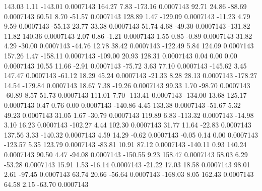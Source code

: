       143.03        1.11     -143.01     0.0007143
      164.27        7.83     -173.16     0.0007143
       92.71       24.86      -88.69     0.0007143
       60.51        8.70      -51.57     0.0007143
      128.89        1.47     -129.09     0.0007143
      -11.23        4.79        9.59     0.0007143
      -55.13       23.77       33.38     0.0007143
       51.74        4.68      -49.30     0.0007143
     -131.82       11.82      140.36     0.0007143
        2.07        0.86       -1.21     0.0007143
        1.55        0.85       -0.89     0.0007143
       31.82        4.29      -30.00     0.0007143
      -44.76       12.78       38.42     0.0007143
     -122.49        5.84      124.09     0.0007143
      157.26        1.47     -158.11     0.0007143
     -109.00       20.93      128.31     0.0007143
        0.04        0.00        0.00     0.0007143
       10.55       11.66       -2.91     0.0007143
      -75.72        3.63       77.10     0.0007143
     -145.62        3.45      147.47     0.0007143
      -61.12       18.29       45.24     0.0007143
      -21.33        8.28       28.13     0.0007143
     -178.27       14.54     -179.84     0.0007143
       18.67        7.38      -19.26     0.0007143
       99.33        1.70      -98.70     0.0007143
      -60.89        8.57       51.73     0.0007143
      111.01        7.70     -113.41     0.0007143
     -134.00       13.68      125.17     0.0007143
        0.47        0.76        0.00     0.0007143
     -140.86        4.45      133.38     0.0007143
      -51.67        5.32       49.23     0.0007143
       31.05        1.67      -30.79     0.0007143
      119.89        6.83     -113.32     0.0007143
      -14.98        3.10       16.23     0.0007143
     -102.27        4.44      102.30     0.0007143
       31.77       11.64      -22.83     0.0007143
      137.56        3.33     -140.32     0.0007143
        4.59       14.29       -0.62     0.0007143
       -0.05        0.14        0.00     0.0007143
     -123.57        5.35      123.79     0.0007143
      -83.81       10.91       87.12     0.0007143
     -140.11        0.93      140.24     0.0007143
       90.50        4.47      -94.08     0.0007143
     -150.55        9.23      158.47     0.0007143
       58.03        6.29      -53.28     0.0007143
       15.91        1.53      -16.14     0.0007143
      -21.22       17.03       18.58     0.0007143
       98.01        2.61      -97.45     0.0007143
       63.74       20.66      -56.64     0.0007143
     -168.03        8.05      162.43     0.0007143
       64.58        2.15      -63.70     0.0007143
